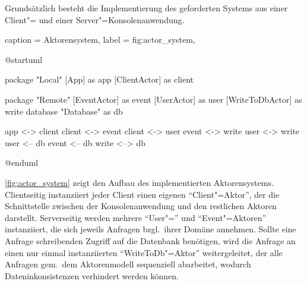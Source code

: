Grundsätzlich besteht die Implementierung des geforderten Systems aus einer Client"= und einer Server"=Konsolenanwendung.

\begin{dhbwfigure}{%
    caption	= Aktorensystem,
    label	= fig:actor_system,
}
\begin{plantuml}
@startuml

package "Local" {
    [App] as app
    [ClientActor] as client
}

package "Remote" {
    [EventActor] as event
    [UserActor] as user
    [WriteToDbActor] as write
    database "Database" as db
}

app <-> client
client <-> event
client <-> user
event <-> write
user <-> write
user <-- db
event <-- db
write <--> db

@enduml
\end{plantuml}
\end{dhbwfigure}

\autoref{fig:actor_system} zeigt den Aufbau des implementierten Aktorensystems.
Clientseitig instanziiert jeder Client einen eigenen \enquote{Client"=Aktor}, der die Schnittstelle zwischen der Konsolenanwendung und den restlichen Aktoren darstellt.
Serverseitig werden mehrere \enquote{User"=} und \enquote{Event"=Aktoren} instanziiert, die sich jeweils Anfragen bzgl.\ ihrer Domäne annehmen.
Sollte eine Anfrage schreibenden Zugriff auf die Datenbank benötigen, wird die Anfrage an einen nur einmal instanziierten \enquote{WriteToDb"=Aktor} weitergeleitet, der alle Anfragen gem.\ dem Aktorenmodell sequenziell abarbeitet, wodurch Dateninkonsistenzen verhindert werden können.
